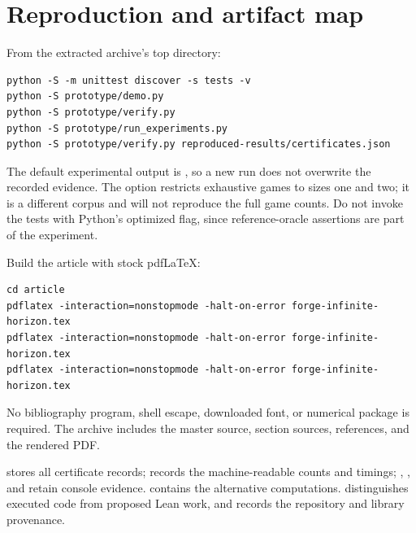 \section{Reproduction and artifact map}
From the extracted archive's top directory:
\begin{lstlisting}
python -S -m unittest discover -s tests -v
python -S prototype/demo.py
python -S prototype/verify.py
python -S prototype/run_experiments.py
python -S prototype/verify.py reproduced-results/certificates.json
\end{lstlisting}
The default experimental output is , so a new run does
not overwrite the recorded evidence. The  option restricts
exhaustive games to sizes one and two; it is a different corpus and will not
reproduce the full game counts. Do not invoke the tests with Python's optimized
 flag, since reference-oracle assertions are part of the experiment.

Build the article with stock pdfLaTeX:
\begin{lstlisting}
cd article
pdflatex -interaction=nonstopmode -halt-on-error forge-infinite-horizon.tex
pdflatex -interaction=nonstopmode -halt-on-error forge-infinite-horizon.tex
pdflatex -interaction=nonstopmode -halt-on-error forge-infinite-horizon.tex
\end{lstlisting}
No bibliography program, shell escape, downloaded font, or numerical package
is required. The archive includes the master source, section sources, references,
and the rendered PDF.

 stores all certificate records;
 records the machine-readable counts and timings;
, , and
 retain console evidence. 
contains the alternative computations.  distinguishes
executed code from proposed Lean work, and  records the
repository and library provenance.

